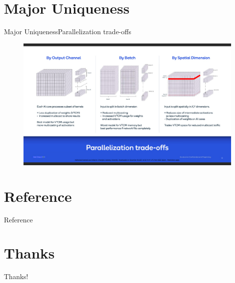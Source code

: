\documentclass[12pt]{beamer}
\begin{document}
\section{Major Uniqueness}
\begin{frame}{Major Uniqueness}{Parallelization trade-offs}
    \begin{figure}[H]
        \centering
        \includegraphics[width=1\textwidth]{7.png}
    \end{figure}
\end{frame}
\section{Reference}
\begin{frame}{Reference}
    \printbibliography
\end{frame}
\section{Thanks}
\begin{frame}
\begin{center}
    \Huge Thanks!
\end{center}
\end{frame}
\end{document}
